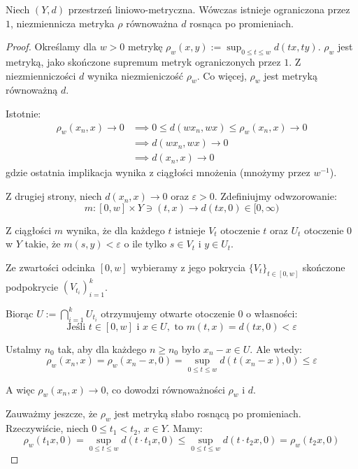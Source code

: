 \begin{thm} \label{thm:eidelheit-mazur} \cite{em}
  Niech $(Y, d)$ przestrzeń liniowo-metryczna. Wówczas istnieje ograniczona przez $1$, niezmiennicza metryka $\rho$ równoważna $d$ rosnąca po promieniach.
  \begin{proof}
    Określamy dla $w > 0$ metrykę $\rho_w(x, y) := \sup_{0 \leq t \leq w} d(tx, ty)$. $\rho_w$ jest metryką, jako skończone supremum metryk ograniczonych przez $1$. Z niezmienniczości $d$ wynika niezmieniczość $\rho_w$. Co więcej, $\rho_w$ jest metryką równoważną $d$.
    
    Istotnie:
    \begin{align*}
      \rho_w(x_n, x) \to 0 &\implies 0 \leq d(w x_n, wx) \leq \rho_w(x_n,x)  \to 0 \\
      &\implies d(wx_n, wx) \to 0 \\
      &\implies d(x_n, x) \to 0
    \end{align*}
    gdzie ostatnia implikacja wynika z ciągłości mnożenia (mnożymy przez $w^{-1}$).
    
    Z drugiej strony, niech $d(x_n, x) \to 0$ oraz $\varepsilon > 0$. Zdefiniujmy odwzorowanie:
    \[m: [0,w] \times Y \ni (t,x) \to d(tx, 0) \in [0,\infty)\]
    
    Z ciągłości $m$ wynika, że dla każdego $t$ istnieje $V_t$ otoczenie $t$ oraz $U_t$ otoczenie $0$ w $Y$ takie, że $m(s, y) < \varepsilon$ o ile tylko $s \in V_t$ i $y \in U_t$.
    
    Ze zwartości odcinka $[0,w]$ wybieramy z jego pokrycia $\{V_t\}_{t \in [0,w]}$ skończone podpokrycie $(V_{t_i})_{i=1}^{k}$.
    
    Biorąc $U := \bigcap_{i=1}^k U_{t_i}$ otrzymujemy otwarte otoczenie $0$ o własności:
    \[\mbox{Jeśli }t \in [0,w]\mbox{ i }x \in U,\mbox{ to } m(t,x) = d(tx, 0) < \varepsilon\]
    
    Ustalmy $n_0$ tak, aby dla każdego $n \geq n_0$ było $x_n - x \in U$. Ale wtedy:
    \[\rho_w(x_n, x) = \rho_w(x_n - x, 0) = \sup_{0 \leq t \leq w} d(t(x_n - x), 0) \leq \varepsilon\]
    
    A więc $\rho_w(x_n, x) \to 0$, co dowodzi równoważności $\rho_w$ i $d$.
    
    Zauważmy jeszcze, że $\rho_w$ jest metryką słabo rosnącą po promieniach. Rzeczywiście, niech $0 \leq t_1 < t_2$, $x \in Y$. Mamy:
    \[\rho_w(t_1 x, 0) = \sup_{0 \leq t \leq w} d(t \cdot t_1 x, 0) \leq \sup_{0 \leq t \leq w} d(t \cdot t_2 x, 0) = \rho_w(t_2 x, 0)\]
    

\end{proof}
\end{thm}
